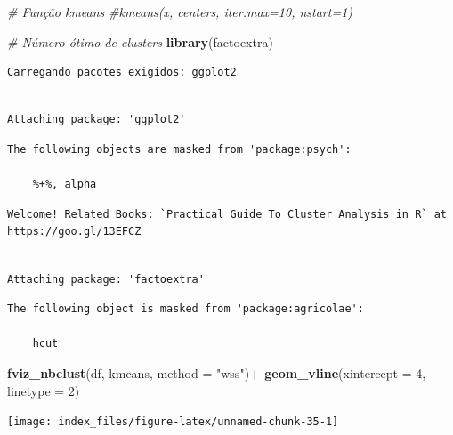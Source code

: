 \documentclass[12pt,brazil,oneside]{book}
\newenvironment{Shaded}{\begin{snugshade}}{\end{snugshade}}
\newcommand{\CommentTok}[1]{\textcolor[rgb]{0.56,0.35,0.01}{\textit{#1}}}
\newcommand{\DataTypeTok}[1]{\textcolor[rgb]{0.13,0.29,0.53}{#1}}
\newcommand{\DecValTok}[1]{\textcolor[rgb]{0.00,0.00,0.81}{#1}}
\newcommand{\KeywordTok}[1]{\textcolor[rgb]{0.13,0.29,0.53}{\textbf{#1}}}
\newcommand{\NormalTok}[1]{#1}
\newcommand{\OperatorTok}[1]{\textcolor[rgb]{0.81,0.36,0.00}{\textbf{#1}}}
\newcommand{\StringTok}[1]{\textcolor[rgb]{0.31,0.60,0.02}{#1}}
\begin{document}
\begin{Shaded}
\begin{Highlighting}[]
\CommentTok{# Função kmeans}
\CommentTok{#kmeans(x, centers, iter.max=10, nstart=1)}

\CommentTok{# Número ótimo de clusters}
\KeywordTok{library}\NormalTok{(factoextra)}
\end{Highlighting}
\end{Shaded}

\begin{verbatim}
Carregando pacotes exigidos: ggplot2
\end{verbatim}

\begin{verbatim}

Attaching package: 'ggplot2'
\end{verbatim}

\begin{verbatim}
The following objects are masked from 'package:psych':

    %+%, alpha
\end{verbatim}

\begin{verbatim}
Welcome! Related Books: `Practical Guide To Cluster Analysis in R` at https://goo.gl/13EFCZ
\end{verbatim}

\begin{verbatim}

Attaching package: 'factoextra'
\end{verbatim}

\begin{verbatim}
The following object is masked from 'package:agricolae':

    hcut
\end{verbatim}

\begin{Shaded}
\begin{Highlighting}[]
\KeywordTok{fviz_nbclust}\NormalTok{(df, kmeans, }\DataTypeTok{method =} \StringTok{"wss"}\NormalTok{)}\OperatorTok{+}
\StringTok{  }\KeywordTok{geom_vline}\NormalTok{(}\DataTypeTok{xintercept =} \DecValTok{4}\NormalTok{, }\DataTypeTok{linetype =} \DecValTok{2}\NormalTok{)}
\end{Highlighting}
\end{Shaded}

\begin{center}\texttt{[image: index\_files/figure-latex/unnamed-chunk-35-1]} \end{center}
\end{document}
